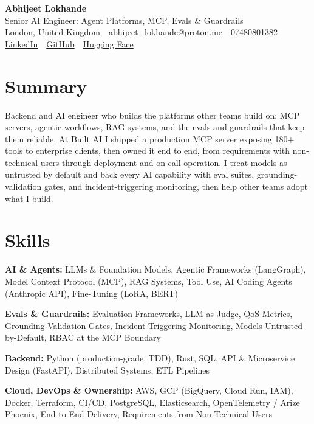 \documentclass[10pt,a4paper]{article}
\newcommand{\sep}{\,\textcolor{accent!60}{\textbar}\,}
\begin{document}
\begin{center}
  {\fontsize{24}{26}\selectfont\bfseries Abhijeet Lokhande}\\[3pt]
  {\color{accent}\large Senior AI Engineer: Agent Platforms, MCP, Evals \& Guardrails}\\[5pt]
  {\small
    London, United Kingdom \sep
    \href{mailto:abhijeet_lokhande@proton.me}{abhijeet\_lokhande@proton.me} \sep
    07480801382 \\[2pt]
    \href{https://www.linkedin.com/in/ablds/}{LinkedIn} \sep
    \href{https://github.com/abhijeetscode}{GitHub} \sep
    \href{https://huggingface.co/ab-ai}{Hugging Face}
  }
\end{center}
\vspace{2pt}

\section{Summary}
Backend and AI engineer who builds the platforms other teams build on: MCP servers, agentic workflows, RAG systems, and the evals and guardrails that keep them reliable. At Built AI I shipped a production MCP server exposing 180+ tools to enterprise clients, then owned it end to end, from requirements with non-technical users through deployment and on-call operation. I treat models as untrusted by default and back every AI capability with eval suites, grounding-validation gates, and incident-triggering monitoring, then help other teams adopt what I build.

\section{Skills}
\begin{tight}
  \item[\textcolor{accent}{\small$\bullet$}] \textbf{AI \& Agents:} LLMs \& Foundation Models, Agentic Frameworks (LangGraph), Model Context Protocol (MCP), RAG Systems, Tool Use, AI Coding Agents (Anthropic API), Fine-Tuning (LoRA, BERT)
  \item[\textcolor{accent}{\small$\bullet$}] \textbf{Evals \& Guardrails:} Evaluation Frameworks, LLM-as-Judge, QoS Metrics, Grounding-Validation Gates, Incident-Triggering Monitoring, Models-Untrusted-by-Default, RBAC at the MCP Boundary
  \item[\textcolor{accent}{\small$\bullet$}] \textbf{Backend:} Python (production-grade, TDD), Rust, SQL, API \& Microservice Design (FastAPI), Distributed Systems, ETL Pipelines
  \item[\textcolor{accent}{\small$\bullet$}] \textbf{Cloud, DevOps \& Ownership:} AWS, GCP (BigQuery, Cloud Run, IAM), Docker, Terraform, CI/CD, PostgreSQL, Elasticsearch, OpenTelemetry / Arize Phoenix, End-to-End Delivery, Requirements from Non-Technical Users
\end{tight}
\end{document}
